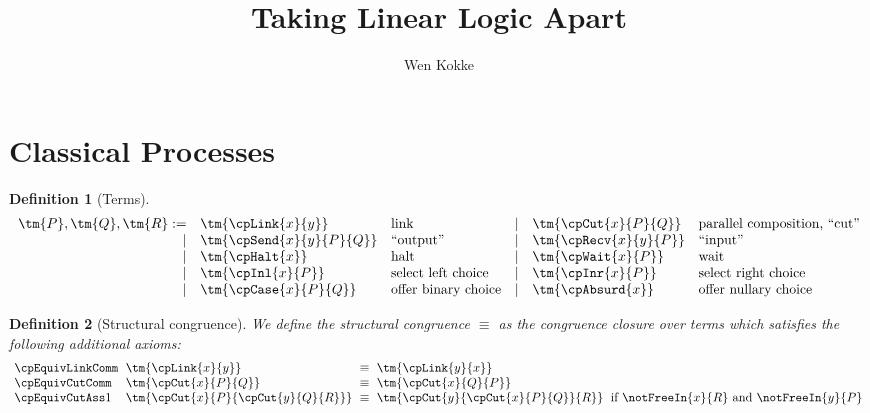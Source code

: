 \documentclass[submission,copyright,creativecommons]{eptcs}
\title{Taking Linear Logic Apart}
\author{%
  Wen Kokke
  \institute{University of Edinburgh\\ Edinburgh, Scotland}
  \email{wen.kokke@ed.ac.uk}}
\newtheorem{definition}{Definition}
\begin{document}
\maketitle

\begin{abstract}
\end{abstract}

\section{Classical Processes}

\begin{definition}[Terms]\label{def:cp-terms}
  \begin{gather*}
    \begin{array}{rllrll}
      \tm{P}, \tm{Q}, \tm{R}
           :=& \tm{\cpLink{x}{y}}       &\text{link}
      &  \mid& \tm{\cpCut{x}{P}{Q}}     &\text{parallel composition, ``cut''}
      \\ \mid& \tm{\cpSend{x}{y}{P}{Q}} &\text{``output''}
      &  \mid& \tm{\cpRecv{x}{y}{P}}    &\text{``input''}
      \\ \mid& \tm{\cpHalt{x}}          &\text{halt}
      &  \mid& \tm{\cpWait{x}{P}}       &\text{wait}
      \\ \mid& \tm{\cpInl{x}{P}}        &\text{select left choice}
      &  \mid& \tm{\cpInr{x}{P}}        &\text{select right choice}
      \\ \mid& \tm{\cpCase{x}{P}{Q}}    &\text{offer binary choice}
      &  \mid& \tm{\cpAbsurd{x}}        &\text{offer nullary choice}
    \end{array}
  \end{gather*}
\end{definition}

\begin{definition}[Structural congruence]\label{def:cp-equiv}
  We define the structural congruence $\equiv$ as the congruence closure over
  terms which satisfies the following additional axioms:
  \begin{gather*}
    \setlength{\arraycolsep}{3pt}
    \begin{array}{llcll}
      \cpEquivLinkComm
      & \tm{\cpLink{x}{y}}
      & \equiv
      & \tm{\cpLink{y}{x}}
      \\
      \cpEquivCutComm
      & \tm{\cpCut{x}{P}{Q}}
      & \equiv
      & \tm{\cpCut{x}{Q}{P}}
      \\
      \cpEquivCutAss1
      & \tm{\cpCut{x}{P}{\cpCut{y}{Q}{R}}}
      & \equiv
      & \tm{\cpCut{y}{\cpCut{x}{P}{Q}}{R}}
      & \text{if }\notFreeIn{x}{R}\text{ and }\notFreeIn{y}{P}
    \end{array}
  \end{gather*}
\end{definition}
\end{document}
